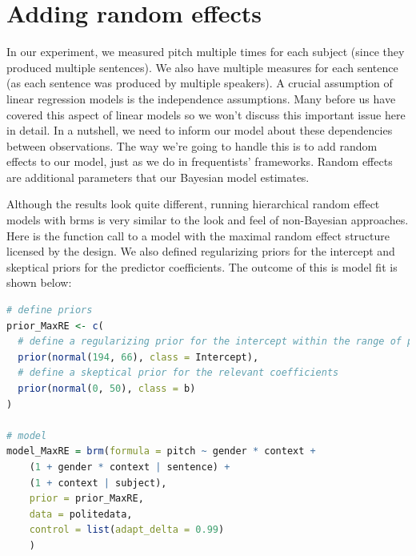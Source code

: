 \documentclass[nobib]{tufte-handout}
\begin{document}
\section{Adding random effects}
In our experiment, we measured pitch multiple times for each subject (since they produced multiple sentences). We also have multiple measures for each sentence (as each sentence was produced by multiple speakers). A crucial assumption of linear regression models is the independence assumptions. Many before us have covered this aspect of linear models \citep[e.g.][]{Winter2013:Linear-models-a, clark1973language} so we won't discuss this important issue here in detail. In a nutshell, we need to inform our model about these dependencies between observations. The way we’re going to handle this is to add random effects to our model, just as we do in frequentists' frameworks. Random effects are additional parameters that our Bayesian model estimates.

Although the results look quite different, running hierarchical random effect models with \textrm{brms} is very similar to the look and feel of non-Bayesian approaches. Here is the function call to a model with the maximal random effect structure licensed by the design. We also defined regularizing priors for the intercept and skeptical priors for the predictor coefficients.
The outcome of this is model fit is shown below:

\begin{minipage}[]{1\textwidth}
\begin{lstlisting}[language=R]
# define priors
prior_MaxRE <- c(
  # define a regularizing prior for the intercept within the range of possible pitch values
  prior(normal(194, 66), class = Intercept),
  # define a skeptical prior for the relevant coefficients
  prior(normal(0, 50), class = b)
)

# model
model_MaxRE = brm(formula = pitch ~ gender * context +
	(1 + gender * context | sentence) +
	(1 + context | subject),
	prior = prior_MaxRE,
	data = politedata,
	control = list(adapt_delta = 0.99)
	)
\end{lstlisting}
\end{minipage}

\medskip
\end{document}

